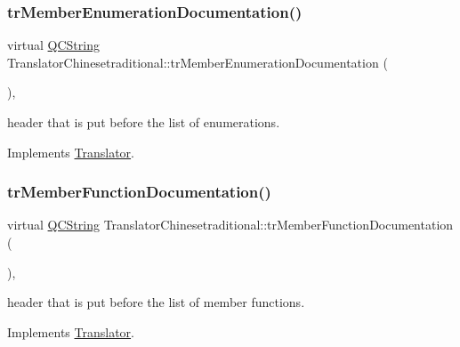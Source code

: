 \subsubsection{\texorpdfstring{trMemberEnumerationDocumentation()}{trMemberEnumerationDocumentation()}}
{\footnotesize\ttfamily virtual \mbox{\hyperlink{class_q_c_string}{Q\+C\+String}} Translator\+Chinesetraditional\+::tr\+Member\+Enumeration\+Documentation (\begin{DoxyParamCaption}{ }\end{DoxyParamCaption})\hspace{0.3cm}{\ttfamily [inline]}, {\ttfamily [virtual]}}

header that is put before the list of enumerations. 

Implements \mbox{\hyperlink{class_translator}{Translator}}.

\mbox{\label{class_translator_chinesetraditional_a777b4cf186ed3ac42c624183568fd61b}} 
\subsubsection{\texorpdfstring{trMemberFunctionDocumentation()}{trMemberFunctionDocumentation()}}
{\footnotesize\ttfamily virtual \mbox{\hyperlink{class_q_c_string}{Q\+C\+String}} Translator\+Chinesetraditional\+::tr\+Member\+Function\+Documentation (\begin{DoxyParamCaption}{ }\end{DoxyParamCaption})\hspace{0.3cm}{\ttfamily [inline]}, {\ttfamily [virtual]}}

header that is put before the list of member functions. 

Implements \mbox{\hyperlink{class_translator}{Translator}}.

\mbox{\label{class_translator_chinesetraditional_a8cefb650274dea8420f41b59f3fd4410}} 
